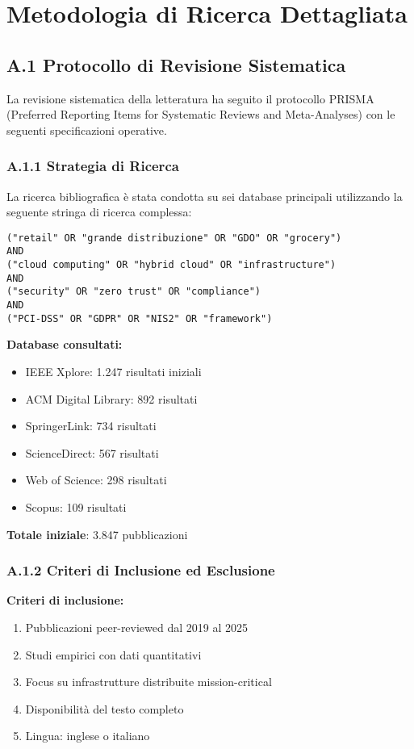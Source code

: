 
\chapter{Metodologia di Ricerca Dettagliata}
\label{app:metodologia}

\section{A.1 Protocollo di Revisione Sistematica}

La revisione sistematica della letteratura ha seguito il protocollo PRISMA (Preferred Reporting Items for Systematic Reviews and Meta-Analyses) con le seguenti specificazioni operative.

\subsection{A.1.1 Strategia di Ricerca}

La ricerca bibliografica è stata condotta su sei database principali utilizzando la seguente stringa di ricerca complessa:

\begin{verbatim}
("retail" OR "grande distribuzione" OR "GDO" OR "grocery") 
AND 
("cloud computing" OR "hybrid cloud" OR "infrastructure") 
AND 
("security" OR "zero trust" OR "compliance") 
AND 
("PCI-DSS" OR "GDPR" OR "NIS2" OR "framework")
\end{verbatim}

\textbf{Database consultati:}
\begin{itemize}
    \item IEEE Xplore: 1.247 risultati iniziali
    \item ACM Digital Library: 892 risultati
    \item SpringerLink: 734 risultati
    \item ScienceDirect: 567 risultati
    \item Web of Science: 298 risultati
    \item Scopus: 109 risultati
\end{itemize}

\textbf{Totale iniziale}: 3.847 pubblicazioni

\subsection{A.1.2 Criteri di Inclusione ed Esclusione}

\textbf{Criteri di inclusione:}
\begin{enumerate}
    \item Pubblicazioni peer-reviewed dal 2019 al 2025
    \item Studi empirici con dati quantitativi
    \item Focus su infrastrutture distribuite mission-critical
    \item Disponibilità del testo completo
    \item Lingua: inglese o italiano
\end{enumerate}

